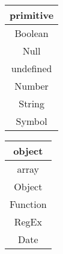 \begin{center}
    \begin{minipage}{5cm}
        \begin{tabular}{|c|}
            \hline
            primitive \\ \hline
            Boolean \\
            Null \\
            undefined \\
            Number \\
            String \\
            Symbol \\ \hline        
        \end{tabular}    
    \end{minipage}
    \begin{minipage}[c]{5cm}
        \begin{tabular}{|c|}
            \hline
            \multicolumn{1}{|c|}{object} \\ \hline             
            array \\
            Object \\
            Function \\
            RegEx \\
            Date \\ \hline
        \end{tabular}
    \end{minipage}
\end{center}